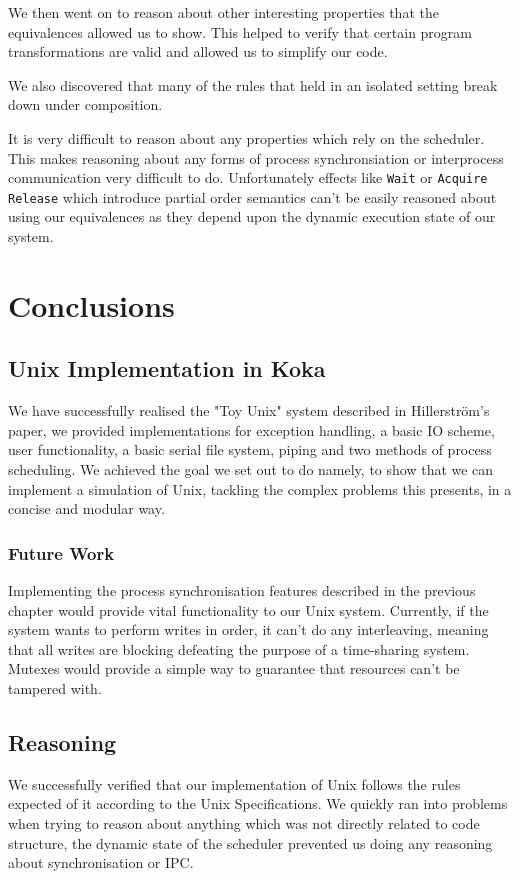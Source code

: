 \documentclass[logo,bsc,singlespacing,parskip]{infthesis}
\begin{document}
We then went on to reason about other interesting properties that the equivalences allowed us to show. This helped to verify that certain program transformations are valid and allowed us to simplify our code. 

We also discovered that many of the rules that held in an isolated setting break down under composition. 

It is very difficult to reason about any properties which rely on the scheduler. This makes reasoning about any forms of process synchronsiation or interprocess communication very difficult to do. Unfortunately effects like \lstinline{Wait} or \lstinline{Acquire} \lstinline{Release} which introduce partial order semantics can't be easily reasoned about using our equivalences as they depend upon the dynamic execution state of our system.

\chapter{Conclusions}

\section{Unix Implementation in Koka}
We have successfully realised the "Toy Unix" system described in Hillerström's paper, we provided implementations for exception handling, a basic IO scheme, user functionality, a basic serial file system, piping and two methods of process scheduling. We achieved the goal we set out to do namely, to show that we can implement a simulation of Unix, tackling the complex problems this presents, in a concise and modular way.

\subsection*{Future Work}
Implementing the process synchronisation features described in the previous chapter would provide vital functionality to our Unix system. Currently, if the system wants to perform writes in order, it can't do any interleaving, meaning that all writes are blocking defeating the purpose of a time-sharing system. Mutexes would provide a simple way to guarantee that resources can't be tampered with.

\section{Reasoning}
We successfully verified that our implementation of Unix follows the rules expected of it according to the Unix Specifications. We quickly ran into problems when trying to reason about anything which was not directly related to code structure, the dynamic state of the scheduler prevented us doing any reasoning about synchronisation or IPC.
\end{document}
